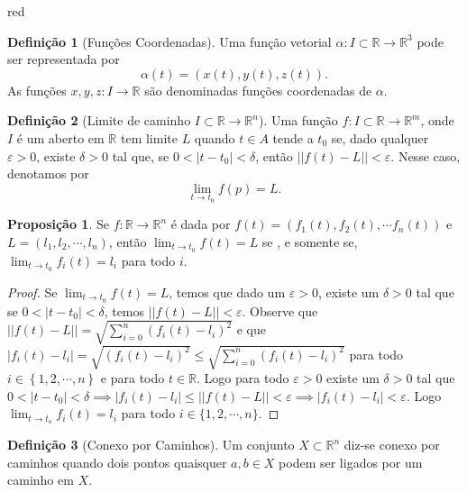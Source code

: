 \documentclass[12pt,leqno,twoside]{amsart}
\theoremstyle{definition}
\newtheorem{proposicao}{Proposição}[section]
\newtheorem{definicao}{Definição}[section]
\begin{document}
\begin{color}{red}
\begin{definicao}[Funções Coordenadas]
	Uma função vetorial $\alpha: I\subset \mathbb{R} \to \mathbb{R}^3$ pode ser representada por $$\alpha(t) =(x(t),y(t), z(t)).$$
	As funções $x,y,z:I \to \mathbb{R}$ são denominadas funções coordenadas de $\alpha$.
\end{definicao}


\begin{definicao}[Limite de caminho $I\subset\mathbb{R} \to \mathbb{R}^n$]
	Uma função $f:I \subset \mathbb{R} \to \mathbb{R}^m$, onde  $I$ é um aberto em $\mathbb{R}$ tem limite $L$ quando $t\in A$ tende a $t_0$ se, dado qualquer $\varepsilon >0$, existe $\delta > 0$ tal que, se $0< |t -t_0| < \delta$, então $||f(t) - L || < \varepsilon$.  Nesse caso, denotamos por $$\lim_{t\to t_0} f(p) = L.$$
\end{definicao}
\begin{proposicao}
	Se $f:\mathbb{R}\to \mathbb{R}^n$ é dada por $f(t) = (f_1(t), f_2(t),\cdots f_n(t))$ e $L = (l_1,l_2,\cdots,l_n)$, então $\displaystyle\lim_{t\to t_0} f(t) = L $ se , e somente se, $\displaystyle\lim_{t\to t_0} f_i(t) = l_i$ para todo $i$.
\end{proposicao}
\begin{proof}
	Se $\displaystyle\lim_{t \to t_0} f(t) = L$, temos que dado um $\varepsilon>0$, existe um $\delta > 0$ tal que se $ 0< |t-t_0|< \delta$, temos $ ||f(t) -L || < \varepsilon$. Observe que $ ||f(t) - L|| = \sqrt{\displaystyle \sum_{i = 0}^n \left(f_i(t) - l_i\right)^2}$ e que $|f_i(t) - l_i | = \sqrt{\left( f_i(t) - l_i\right)^2} \leq\sqrt{\displaystyle \sum_{i = 0}^n \left(f_i(t) - l_i\right)^2}$ para todo $i\in \left\{1,2,\cdots,n\right\}$ e para todo $t\in \mathbb{R}$. Logo para todo $\varepsilon>0$ existe um $\delta > 0$ tal que $ 0 < |t-t_0| < \delta \implies |f_i (t) -l_i|\leq || f(t) -L|| < \varepsilon \implies |f_i(t) - l_i | < \varepsilon $. Logo $\displaystyle \lim_{t \to t_o} f_i(t) = l_i$ para todo $i\in \{1,2,\cdots,n \}$.
\end{proof}


\vspace{0.3cm}

\begin{definicao}[Conexo por Caminhos]
	Um conjunto $X\subset \mathbb{R}^n$ diz-se conexo por caminhos quando dois pontos quaisquer $a,b\in X$ podem ser ligados por um caminho em $X$.
\end{definicao}

\vspace{0.3cm}


\end{color}
\end{document}
